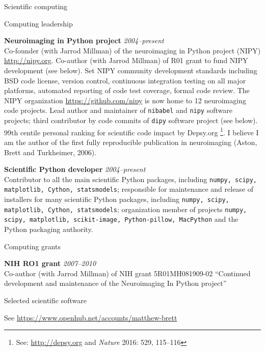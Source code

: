 \documentclass{cv}
\newcommand{\PlaceDateNote}[3]{{\bf #1} \hfill {\em #2} \\#3}
\newcommand{\Pkg}[1]{{\tt #1}}
\begin{document}
\begin{cvSection}{Scientific computing}

\begin{cvSubSection}{Computing leadership}

\PlaceDateNote{Neuroimaging in Python project}{2004--present}
{Co-founder (with Jarrod Millman) of the neuroimaging in Python project (NIPY)
    \url{http://nipy.org}.  Co-author (with Jarrod Millman) of R01 grant to
    fund NIPY development (see below).  Set
    NIPY community development standards including BSD code license, version
    control, continuous integration testing on all major platforms, automated
    reporting of code test coverage, formal code review.  The NIPY
    organization \url{https://github.com/nipy} is now home to 12 neuroimaging
code projects.  Lead author and maintainer of \Pkg{nibabel} and \Pkg{nipy}
software projects; third contributor by code commits of \Pkg{dipy} software
project (see below).  99th centile personal ranking for scientific code impact
by Depsy.org \footnote{See: \url{http://depsy.org} and {\em Nature} 2016: 529,
115–116\label{depsy}}. I believe I am the author of the first fully
reproducible publication in neuroimaging (Aston, Brett and Turkheimer, 2006).
}

\PlaceDateNote{Scientific Python developer}{2004--present}
{Contributor to all the main scientific Python packages, including \Pkg{numpy,
    scipy, matplotlib, Cython, statsmodels}; responsible for maintenance and
    release of installers for many scientific Python packages, including
    \Pkg{numpy, scipy, matplotlib, Cython, statsmodels}; organization member
    of projects \Pkg{numpy, scipy, matplotlib, scikit-image, Python-pillow,
    MacPython} and the Python packaging
authority.}

\end{cvSubSection}

\begin{cvSubSection}{Computing grants}

\PlaceDateNote{NIH RO1 grant}{2007--2010}
{Co-author (with Jarrod Millman) of NIH grant 5R01MH081909-02 ``Continued
development and maintenance of the Neuroimaging In Python project''}

\end{cvSubSection}

\begin{cvSubSection}{Selected scientific software}

See \url{https://www.openhub.net/accounts/matthew-brett}


\end{cvSubSection}
\end{cvSection}
\end{document}
